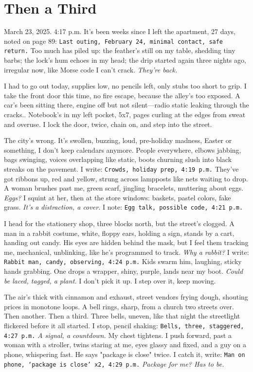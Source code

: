 \documentclass[12pt,oneside]{book}
\newcommand{\note}[1]{\texttt{#1}}
\begin{document}
\chapter{Then a Third}

March 23, 2025. 4:17 p.m. It’s been weeks since I left the apartment, 27 days, noted on page 89: \note{Last outing, February 24, minimal contact, safe return.} Too much has piled up: the feather’s still on my table, shedding tiny barbs; the lock’s hum echoes in my head; the drip started again three nights ago, irregular now, like Morse code I can’t crack. \textit{They’re back.}

I had to go out today, supplies low, no pencils left, only stubs too short to grip. I take the front door this time, no fire escape, because the alley’s too exposed. A car’s been sitting there, engine off but not silent—radio static leaking through the cracks.. Notebook’s in my left pocket, 5x7, pages curling at the edges from sweat and overuse. I lock the door, twice, chain on, and step into the street.

The city’s wrong. It’s swollen, buzzing, loud, pre-holiday madness, Easter or something, I don’t keep calendars anymore. People everywhere, elbows jabbing, bags swinging, voices overlapping like static, boots churning slush into black streaks on the pavement. I write: \note{Crowds, holiday prep, 4:19 p.m.} They’ve got ribbons up, red and yellow, strung across lampposts like nets waiting to drop. A woman brushes past me, green scarf, jingling bracelets, muttering about eggs. \textit{Eggs?} I squint at her, then at the store windows: baskets, pastel colors, fake grass. \textit{It’s a distraction, a cover.} I note: \note{Egg talk, possible code, 4:21 p.m.}

I head for the stationery shop, three blocks north, but the street’s clogged. A man in a rabbit costume, white, floppy ears, holding a sign, stands by a cart, handing out candy. His eyes are hidden behind the mask, but I feel them tracking me, mechanical, unblinking, like he’s programmed to track. \textit{Why a rabbit?} I write: \note{Rabbit man, candy, observing, 4:24 p.m.} Kids swarm him, laughing, sticky hands grabbing. One drops a wrapper, shiny, purple, lands near my boot. \textit{Could be laced, tagged, a plant.} I don’t pick it up. I step over it, keep moving.

The air’s thick with cinnamon and exhaust, street vendors frying dough, shouting prices in monotone loops. A bell rings, sharp, from a church two streets over. Then another. Then a third. Three bells, uneven, like that night the streetlight flickered before it all started. I stop, pencil shaking: \note{Bells, three, staggered, 4:27 p.m.} \textit{A signal, a countdown.} My chest tightens. I push forward, past a woman with a stroller, twins staring at me, eyes glassy and fixed, and a guy on a phone, whispering fast. He says "package is close" twice. I catch it, write: \note{Man on phone, ‘package is close’ x2, 4:29 p.m.} \textit{Package for me? Has to be.}
\end{document}
